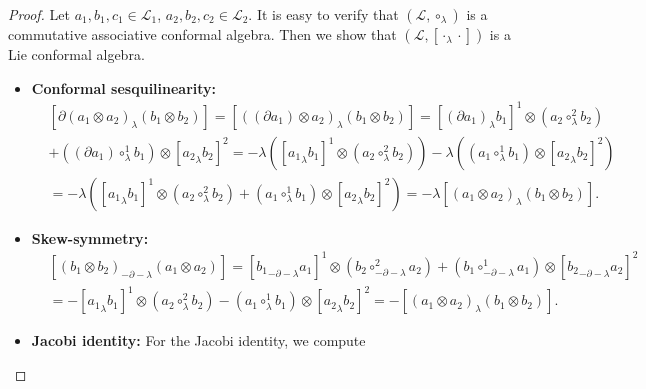 \documentclass[11pt,letterpaper,reqno]{amsart}
\theoremstyle{definition}
\numberwithin{equation}{section}
\begin{document}
\begin{proof}
Let $a_1,b_1,c_1 \in \mathcal{L}_1$, $a_2,b_2,c_2 \in \mathcal{L}_2$. It is easy to verify that $(\mathcal L,\circ_\lambda)$ is a commutative associative conformal algebra.
Then we show that $(\mathcal L,[\cdot_\lambda\cdot])$ is a Lie conformal algebra. %
\begin{itemize}
\item[(a)] {\bf{Conformal sesquilinearity}:}
\begin{align*}
&[\partial(a_1\otimes a_2)_\lambda (b_1\otimes b_2)]=[((\partial a_1)\otimes a_2)_\lambda (b_1\otimes b_2)]
= [{(\partial a_1)}_{\lambda}b_1]^{1}\otimes (a_2\circ^{2}_\lambda b_2)\\
&+((\partial a_1)\circ^{1}_\lambda b_1)\otimes [{a_2}_{\lambda}b_2]^{2}
= -\lambda([{a_1}_{\lambda}b_1]^{1}\otimes (a_2\circ^{2}_\lambda b_2))-\lambda((a_1\circ^{1}_\lambda b_1)\otimes [{a_2}_{\lambda}b_2]^{2})\\
&=-\lambda ([{a_1}_{\lambda}b_1]^{1}\otimes (a_2\circ^{2}_\lambda b_2)+(a_1\circ^{1}_\lambda b_1)\otimes [{a_2}_{\lambda}b_2]^{2})
=-\lambda [(a_1\otimes a_2)_\lambda (b_1\otimes b_2)].
\end{align*}
\item[(b)] {\bf{Skew-symmetry}:} 
\begin{align*}
&[(b_1\otimes b_2)_{-\partial-\lambda} (a_1\otimes a_2)]=[{b_1}_{-\partial-\lambda}a_1]^{1}\otimes (b_2\circ^{2}_{-\partial-\lambda} a_2)+(b_1\circ^{1}_{-\partial-\lambda} a_1)\otimes [{b_2}_{-\partial-\lambda}a_2]^{2}\\
&=-[{a_1}_{\lambda}b_1]^{1}\otimes (a_2\circ^{2}_\lambda b_2)-(a_1\circ^{1}_\lambda b_1)\otimes [{a_2}_{\lambda}b_2]^{2}
=-[(a_1\otimes a_2)_\lambda (b_1\otimes b_2)].
\end{align*}
\item[(c)] {\bf{Jacobi identity}:} For the Jacobi identity, we compute

\end{itemize}
\end{proof}
\end{document}
